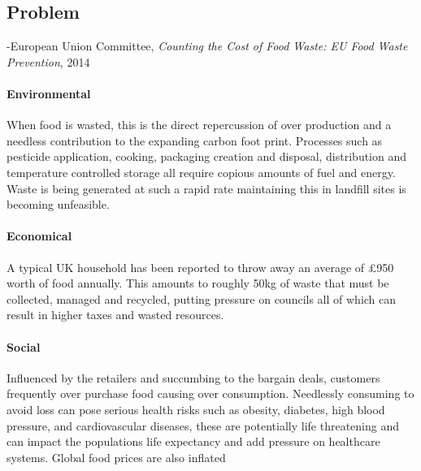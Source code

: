\documentclass[a4paper, 11pt]{article}
\begin{document}
\vspace{\baselineskip}

\subsection{Problem}


\begin{quoting}
-European Union Committee, \emph{Counting the Cost of Food Waste: EU Food Waste Prevention}, 2014\cite{FoodWaste}
\end{quoting}

\paragraph{Environmental}When food is wasted, this is the direct repercussion of over production and a needless contribution to the expanding carbon foot print. Processes such as pesticide application, cooking, packaging creation and disposal, distribution and temperature controlled storage all require copious amounts of fuel and energy. Waste is being generated at such a rapid rate maintaining this in landfill sites is becoming unfeasible.\cite{waste}

\paragraph{Economical}A typical UK household has been reported to throw away an average of \pounds950 worth of food annually. This amounts to roughly 50kg of waste that must be collected, managed and recycled, putting pressure on councils all of which can result in higher taxes and wasted resources.\cite{FoodWaste}

\paragraph{Social} Influenced by the retailers and succumbing to the bargain deals, customers frequently over purchase food causing over consumption. Needlessly consuming to avoid loss can pose serious health risks such as obesity, diabetes, high blood pressure, and cardiovascular diseases, these are potentially life threatening and can impact the populations life expectancy and add pressure on healthcare systems. Global food prices are also inflated\cite{obesity}
\end{document}
